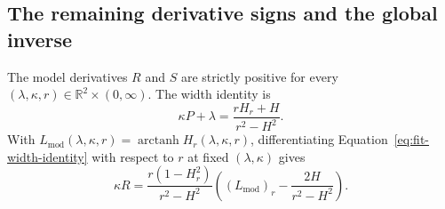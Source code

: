 \subsection{The remaining derivative signs and the global inverse}

\begin{lemma}\label{fit:positive-derivatives}
The model derivatives \(R\) and \(S\) are strictly positive for every
\((\lambda,\kappa,r)\in\mathbb R^2\times(0,\infty)\).
The width identity is
\begin{equation}\label{eq:fit-width-identity}
 \kappa P+\lambda=\frac{rH_r+H}{r^2-H^2}.
\end{equation}
With \(L_{\mathrm{mod}}(\lambda,\kappa,r)
=\operatorname{arctanh}H_r(\lambda,\kappa,r)\), differentiating
Equation~\eqref{eq:fit-width-identity} with respect to \(r\)
at fixed \((\lambda,\kappa)\) gives
\begin{equation}\label{eq:fit-R-identity}
 \kappa R
 =\frac{r(1-H_r^2)}{r^2-H^2}
   \left((L_{\mathrm{mod}})_r-\frac{2H}{r^2-H^2}\right).
\end{equation}
\end{lemma}

